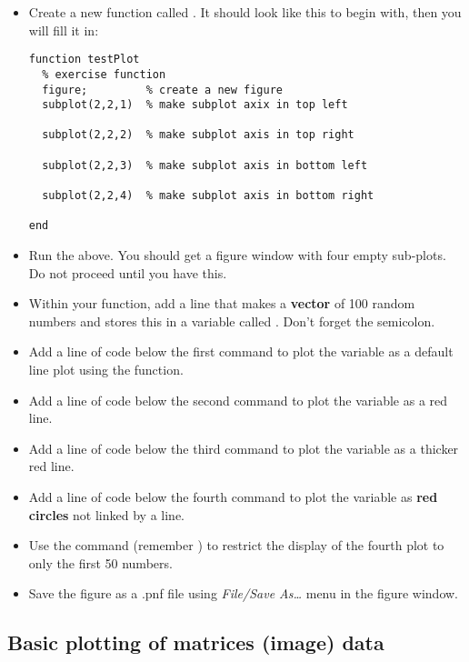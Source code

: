\documentclass{article}
\begin{document}
\begin{itemize}
\item Create a new function called . It should look like this to begin with, then you will fill it in:
\begin{lstlisting}
function testPlot
  % exercise function
  figure;         % create a new figure
  subplot(2,2,1)  % make subplot axix in top left

  subplot(2,2,2)  % make subplot axis in top right

  subplot(2,2,3)  % make subplot axis in bottom left

  subplot(2,2,4)  % make subplot axis in bottom right

end
\end{lstlisting}

\item Run the above. You should get a figure window with four empty sub-plots.
  Do not proceed until you have this.
\item Within your function, add a line that makes a \textbf{vector} of 100 random numbers and stores this in a variable called .
  Don't forget the semicolon.
\item Add a line of code below the first  command to plot the variable  as a default line plot using the  function.
\item Add a line of code below the second  command to plot the variable  as a red line.
\item Add a line of code below the third  command to plot the variable  as a thicker red line.
\item Add a line of code below the fourth  command to plot the variable  as \textbf{red circles} not linked by a line.
\item Use the  command (remember ) to restrict the display of the fourth plot to only the first 50 numbers.
\item Save the figure as a .pnf file using \emph{File/Save As\dots} menu in the figure window.
\end{itemize}

\subsection*{Basic plotting of matrices (image) data}

\end{document}
